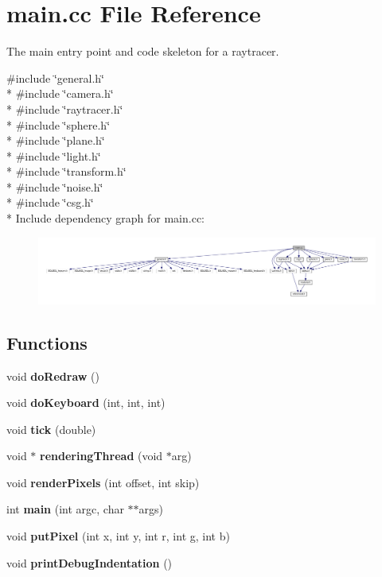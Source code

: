\section{main.\+cc File Reference}
\label{main_8cc}


The main entry point and code skeleton for a raytracer.  


{\ttfamily \#include \char`\"{}general.\+h\char`\"{}}\\*
{\ttfamily \#include \char`\"{}camera.\+h\char`\"{}}\\*
{\ttfamily \#include \char`\"{}raytracer.\+h\char`\"{}}\\*
{\ttfamily \#include \char`\"{}sphere.\+h\char`\"{}}\\*
{\ttfamily \#include \char`\"{}plane.\+h\char`\"{}}\\*
{\ttfamily \#include \char`\"{}light.\+h\char`\"{}}\\*
{\ttfamily \#include \char`\"{}transform.\+h\char`\"{}}\\*
{\ttfamily \#include \char`\"{}noise.\+h\char`\"{}}\\*
{\ttfamily \#include \char`\"{}csg.\+h\char`\"{}}\\*
Include dependency graph for main.\+cc\+:
\nopagebreak
\begin{figure}[H]
\begin{center}
\leavevmode
\includegraphics[width=350pt]{main_8cc__incl}
\end{center}
\end{figure}
\subsection*{Functions}
\begin{DoxyCompactItemize}
\item 
void {\bf do\+Redraw} ()
\item 
void {\bf do\+Keyboard} (int, int, int)
\item 
void {\bf tick} (double)
\item 
void $\ast$ {\bf rendering\+Thread} (void $\ast$arg)
\item 
void {\bf render\+Pixels} (int offset, int skip)
\item 
int {\bf main} (int argc, char $\ast$$\ast$args)
\item 
void {\bf put\+Pixel} (int x, int y, int r, int g, int b)
\item 
void {\bf print\+Debug\+Indentation} ()
\end{DoxyCompactItemize}
